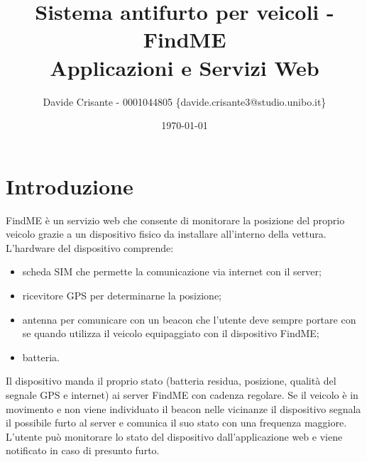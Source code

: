 \documentclass{report}
\title{
    Sistema antifurto per veicoli - FindME \\
    \large Applicazioni e Servizi Web
}
\author{Davide Crisante - 0001044805 \{davide.crisante3@studio.unibo.it\}}
\date{\today}
\begin{document}
\maketitle


\section{Introduzione}
FindME è un servizio web che consente di monitorare la posizione del proprio veicolo grazie a un dispositivo fisico da installare all'interno della vettura.\\
L'hardware del dispositivo comprende:
\begin{itemize}
    \item scheda SIM che permette la comunicazione via internet con il server;
    \item ricevitore GPS per determinarne la posizione;
    \item antenna per comunicare con un beacon che l'utente deve sempre portare con se quando utilizza il veicolo equipaggiato con il dispositivo FindME;
    \item batteria.
\end{itemize}

Il dispositivo manda il proprio stato (batteria residua, posizione, qualità del segnale GPS e internet) ai server FindME con cadenza regolare. Se il veicolo è in movimento e non viene individuato il beacon nelle vicinanze il dispositivo segnala il possibile furto al server e comunica il suo stato con una frequenza maggiore.\\
L'utente può monitorare lo stato del dispositivo dall'applicazione web e viene notificato in caso di presunto furto.
\newpage
\end{document}
